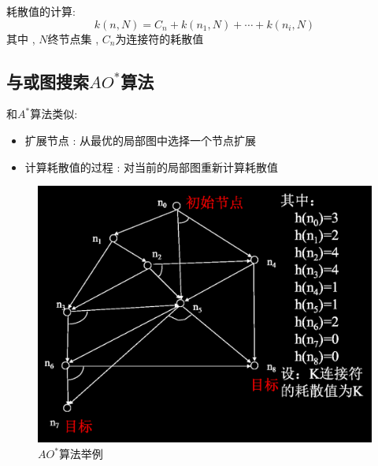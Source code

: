 \documentclass[UTF8,a4paper]{ctexart}
\begin{document}
耗散值的计算:
\[k(n,N) = C_n + k(n_1 , N) + \cdots + k(n_i , N)\]
其中 , $N$终节点集 , $C_n$为连接符的耗散值

\subsection{与或图搜索$AO^*$算法}
和$A^*$算法类似:
\begin{itemize}
	\item 扩展节点 : 从最优的局部图中选择一个节点扩展
	\item 计算耗散值的过程 : 对当前的局部图重新计算耗散值
\end{itemize}

\begin{figure}[H]
	\centering
	\includegraphics[scale = 0.3]{assets/ArtificialIntelligence_d9a6d.png}
	\caption{$AO^*$算法举例}
\end{figure}
\end{document}
